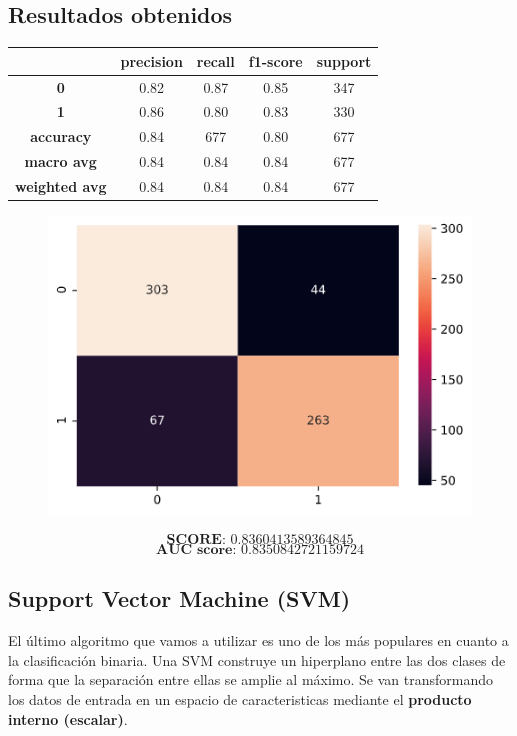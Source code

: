 \documentclass[11pt,a4paper]{article}
\begin{document}
\subsection*{Resultados obtenidos}
\begin{table}[H]
    \centering
    \begin{tabular}{c|cccc}
        \textbf{} & \textbf{precision} & \textbf{recall} & \textbf{f1-score} & \textbf{support} \\ \hline
        \textbf{0} & 0.82 & 0.87 & 0.85 & 347 \\
        \textbf{1} & 0.86 & 0.80 & 0.83 & 330 \\ \hline
        \textbf{accuracy} & 0.84 & 677 & 0.80 & 677 \\
        \textbf{macro avg} & 0.84 & 0.84 & 0.84 & 677 \\
        \textbf{weighted avg} & 0.84 & 0.84 & 0.84 & 677
    \end{tabular}
\end{table}

\begin{figure}[H]
    \centering
    \includegraphics[scale=0.5]{img/matrix-neuralnetwork.png}    
\end{figure}
$$\textbf{SCORE:  } 0.8360413589364845$$
$$\textbf{AUC score:  } 0.8350842721159724$$

\subsection{Support Vector Machine (SVM)}
El último algoritmo que vamos a utilizar es uno de los más populares en cuanto a la clasificación binaria. Una SVM construye
un hiperplano entre las dos clases de forma que la separación entre ellas se amplie al máximo. Se van transformando los datos
de entrada en un espacio de caracteristicas mediante el \textbf{producto interno (escalar)}.
\end{document}
